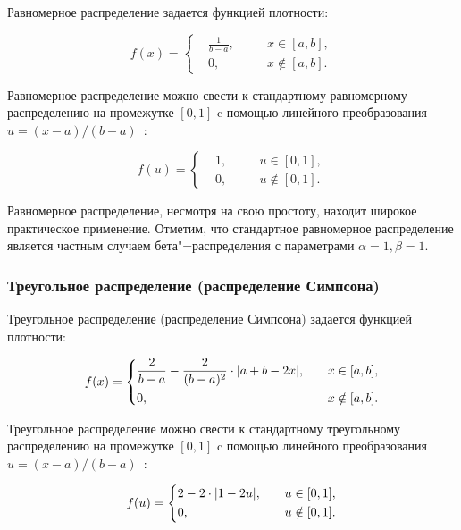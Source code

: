 \documentclass[a4paper, article, 14pt]{extarticle}
\begin{document}
Равномерное распределение задается функцией плотности:

\begin{equation}\label{eq:uniform_distribtuion}
	f(x) =
	\left\{
		\begin{aligned}
			&\frac{1}{b - a}, \quad && x \in [a, b],\\
			&0, \quad && x \notin [a, b].
		\end{aligned}
	\right.
\end{equation}

Равномерное распределение можно свести к стандартному равномерному распределению на промежутке $[0, 1]$ c помощью линейного преобразования $u = (x - a) / (b - a)$~\cite{koroluk}:

\begin{equation}\label{eq:standard_uniform_distribtuion}
	f(u) =
	\left\{
		\begin{aligned}
			&1, \quad && u \in [0, 1],\\
			&0, \quad && u \notin [0, 1].
		\end{aligned}
	\right.
\end{equation}

Равномерное распределение, несмотря на свою простоту, находит широкое практическое применение. Отметим, что стандартное равномерное распределение является частным случаем бета"=распределения с параметрами $\alpha = 1, \beta = 1$.

\subsubsection{Треугольное распределение (распределение Симпсона)}\label{sec:simpson_distribtuion}

Треугольное распределение (распределение Симпсона) задается функцией плотности:

\begin{equation}\label{eq:simpson_distribtuion}
	f(x) =
	\left\{
		\begin{aligned}
			&\frac{2}{b - a} - \frac{2}{(b - a)^2} \cdot \abs*{a + b - 2x}, \quad && x \in [a, b],\\
			&0, \quad && x \notin [a, b].
		\end{aligned}
	\right.
\end{equation}

Треугольное распределение можно свести к стандартному треугольному распределению на промежутке $[0, 1]$ c помощью линейного преобразования $u = (x - a) / (b - a)$~\cite{koroluk}:

\begin{equation}\label{eq:standard_simpson_distribtuion}
	f(u) =
	\left\{
		\begin{aligned}
			&2 - 2 \cdot \abs*{1 - 2u}, \quad && u \in [0, 1],\\
			&0, \quad && u \notin [0, 1].
		\end{aligned}
	\right.
\end{equation}
\end{document}
